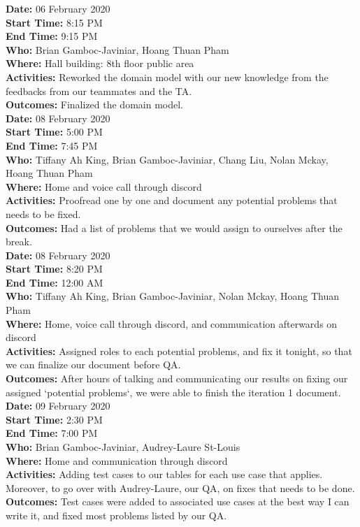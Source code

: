 \documentclass[12pt]{article}
\begin{document}
{\bf Date:} 06 February 2020\\
{\bf Start Time:} 8:15 PM\\
{\bf End Time:} 9:15 PM \\
{\bf Who:} Brian Gamboc-Javiniar, Hoang Thuan Pham\\
{\bf Where:} Hall building: 8th floor public area \\
{\bf Activities:} Reworked the domain model with our new knowledge from the feedbacks from our teammates and the TA.\\
{\bf Outcomes:} Finalized the domain model.\\

{\bf Date:} 08 February 2020\\
{\bf Start Time:} 5:00 PM\\
{\bf End Time:} 7:45 PM \\
{\bf Who:} Tiffany Ah King, Brian Gamboc-Javiniar, Chang Liu, Nolan Mckay, Hoang Thuan Pham\\
{\bf Where:} Home and voice call through discord \\
{\bf Activities:} Proofread one by one and document any potential problems that needs to be fixed.\\
{\bf Outcomes:} Had a list of problems that we would assign to ourselves after the break.\\

{\bf Date:} 08 February 2020\\
{\bf Start Time:} 8:20 PM\\
{\bf End Time:} 12:00 AM \\
{\bf Who:} Tiffany Ah King, Brian Gamboc-Javiniar, Nolan Mckay, Hoang Thuan Pham\\
{\bf Where:} Home, voice call through discord, and communication afterwards on discord \\
{\bf Activities:} Assigned roles to each potential problems, and fix it tonight, so that we can finalize our document before QA.\\
{\bf Outcomes:} After hours of talking and communicating our results on fixing our assigned `potential problems`, we were able to finish the iteration 1 document.\\

{\bf Date:} 09 February 2020\\
{\bf Start Time:} 2:30 PM\\
{\bf End Time:} 7:00 PM \\
{\bf Who:} Brian Gamboc-Javiniar, Audrey-Laure St-Louis\\
{\bf Where:} Home and communication through discord \\
{\bf Activities:} Adding test cases to our tables for each use case that applies. Moreover, to go over with Audrey-Laure, our QA, on fixes that needs to be done. \\
{\bf Outcomes:} Test cases were added to associated use cases at the best way I can write it, and fixed most problems listed by our QA.\\


\end{document}
